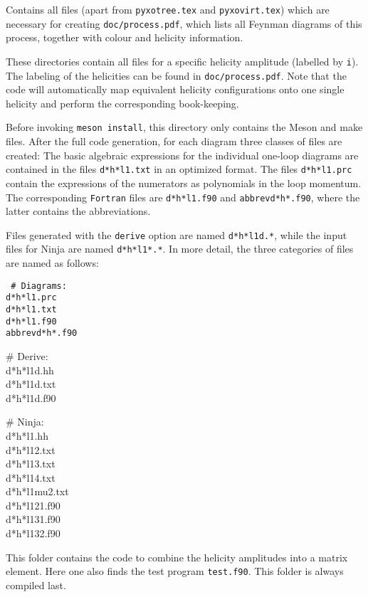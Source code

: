 \documentclass[11pt,a4paper]{refrep}
\newcommand{\ninja}{{\sc Ninja}\xspace}
\begin{document}
 Contains all files (apart from
\texttt{pyxotree.tex} and \texttt{pyxovirt.tex}) which are
necessary for creating
\texttt{doc/process.pdf}, which lists all Feynman diagrams of this process, 
together with colour and helicity information.

 These directories contain all files for a specific
helicity amplitude (labelled by {\tt i}). The labeling of the helicities can be found in
\texttt{doc/process.pdf}. 
Note that the code will automatically map equivalent helicity 
configurations onto one single helicity and perform the corresponding book-keeping.

Before invoking \texttt{meson install}, 
this directory only contains the Meson and make files. After the full code
generation, for each diagram three classes of files are created: The
basic algebraic expressions for the individual one-loop diagrams are
contained in the files {\tt d*h*l1.txt} in an optimized format. The
files {\tt d*h*l1.prc} contain the expressions of the numerators as 
polynomials in the loop momentum. The corresponding {\tt Fortran} files
are {\tt d*h*l1.f90} and {\tt abbrevd*h*.f90}, where the latter
contains the abbreviations. 

Files generated with the {\tt derive} option  are
named {\tt d*h*l1d.*}, while the input files
for \ninja{}  are named {\tt d*h*l1*.*}. 
In more detail, the three categories of files are named as follows:\\
{\tt
\# Diagrams:\\
 d*h*l1.prc\\
 d*h*l1.txt\\
 d*h*l1.f90\\
 abbrevd*h*.f90

\# Derive:\\
 d*h*l1d.hh\\
 d*h*l1d.txt\\
 d*h*l1d.f90

\# Ninja:\\
 d*h*l1.hh\\
 d*h*l12.txt\\
 d*h*l13.txt\\
 d*h*l14.txt\\
 d*h*l1mu2.txt\\
 d*h*l121.f90\\
 d*h*l131.f90\\
 d*h*l132.f90
}

 This folder contains the code to combine
the helicity amplitudes into a matrix element. Here one also finds
the test program \texttt{test.f90}. This folder is always compiled last.
\end{document}
